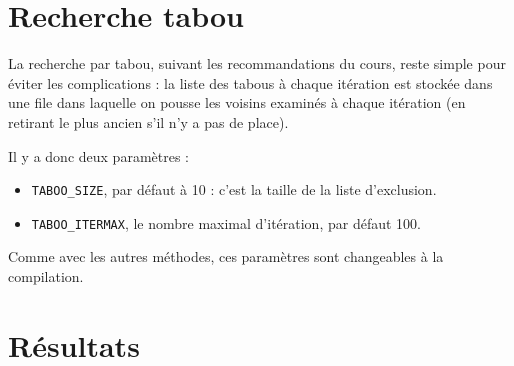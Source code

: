 \documentclass[12pt, a4paper]{article}
\begin{document}
\section{Recherche tabou}
La recherche par tabou, suivant les recommandations du cours, reste
simple pour éviter les complications : la liste des tabous à chaque itération est stockée 
dans une file dans laquelle on pousse les voisins examinés 
à chaque itération (en retirant le plus ancien s'il n'y a pas de place).

Il y a donc deux paramètres :
\begin{itemize}
\item \texttt{TABOO\_{}SIZE}, par défaut à 10 : c'est la taille de la liste d'exclusion.
\item \texttt{TABOO\_{}ITERMAX}, le nombre maximal d'itération, par défaut 100.
\end{itemize}
Comme avec les autres méthodes, ces paramètres sont changeables à la compilation.

\section{Résultats}
\end{document}
